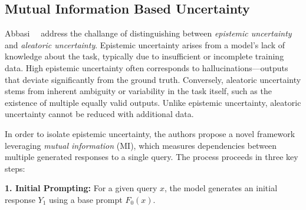 
\subsection{Mutual Information Based Uncertainty} %
\label{sec:background_MI}


Abbasi~\etal~\cite{abbasi2024believe} address the challange of distinguishing between \emph{epistemic uncertainty} and \emph{aleatoric uncertainty}.
Epistemic uncertainty arises from a model's lack of knowledge about the task, typically due to insufficient or incomplete training data. 
            High epistemic uncertainty often corresponds to hallucinations—outputs that deviate significantly from the ground truth.
 Conversely, aleatoric uncertainty stems from inherent ambiguity or variability in the task itself, such as the existence of multiple equally valid outputs. 
            Unlike epistemic uncertainty, aleatoric uncertainty cannot be reduced with additional data.

In order to isolate epistemic uncertainty, the authors propose a novel framework leveraging \emph{mutual information} (MI), which measures dependencies between multiple generated responses to a single query. 
%
The process proceeds in three key steps:

    \noindent\textbf{1. Initial Prompting:} For a given query \(x\), the model generates an initial response \(Y_1\) using a base prompt \(F_0(x)\). %

